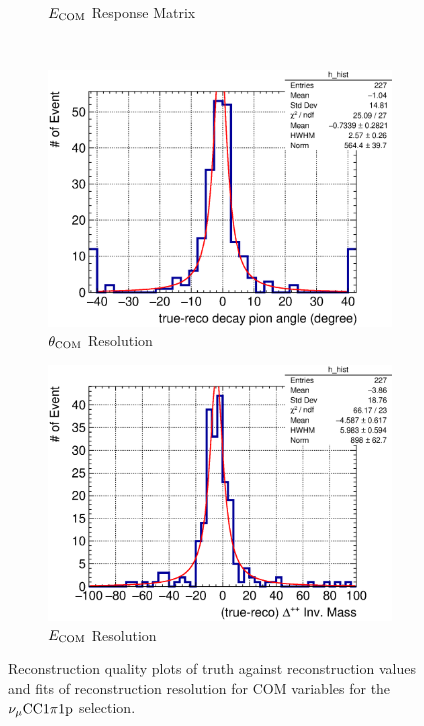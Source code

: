 \begin{figure}
\begin{subfigure}[b]{\dbfigwid\textwidth}
               \caption{$E_{\textrm{COM}}$ Response Matrix}
               \label{subfig:reco-com-e-resmat}
          \end{subfigure}
          \\
          \begin{subfigure}[b]{\dbfigwid\textwidth}
               \centering
               \includegraphics[width=\textwidth]{figures/COM/SFGpTPCmu_dang_res_hist_al15.eps}
               \caption{$\theta_{\textrm{COM}}$ Resolution}
               \label{subfig:reco-com-t-res}
          \end{subfigure}
          \begin{subfigure}[b]{\dbfigwid\textwidth}
               \centering
               \includegraphics[width=\textwidth]{figures/COM/SFGpTPCmu_edelta_res_hist_al15.eps}
               \caption{$E_{\textrm{COM}}$ Resolution}
               \label{subfig:reco-com-e-res}
          \end{subfigure}
          \caption{Reconstruction quality plots of truth against reconstruction values and fits of reconstruction resolution for COM variables for the $\nu_{\mu}\textrm{CC}1\pi1\textrm{p}$ selection.}
          \label{fig:com-reco}
     \end{figure}
